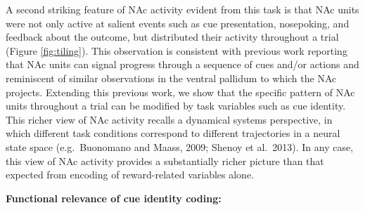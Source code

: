 \documentclass[11pt]{article}
\let\cite=\citep
\providecommand{\DIFadd}[1]{{\protect\color{red} \sf #1}} %
\providecommand{\DIFdel}[1]{} %
\providecommand{\DIFaddbegin}{} %
\providecommand{\DIFaddend}{} %
\providecommand{\DIFdelbegin}{} %
\providecommand{\DIFdelend}{} %
\newcommand{\DIFscaledelfig}{0.5}
\newlength{\DIFdelgraphicswidth} %
\newlength{\DIFdelgraphicsheight} %
\newcommand{\DIFaddincludegraphics}[2][]{{\color{red}\fbox{\DIFOincludegraphics[#1]{#2}}}} %
\newcommand{\DIFdelincludegraphics}[2][]{%
\sbox{\DIFdelgraphicsbox}{\DIFOincludegraphics[#1]{#2}}%
\settoboxwidth{\DIFdelgraphicswidth}{\DIFdelgraphicsbox} %
\settoboxtotalheight{\DIFdelgraphicsheight}{\DIFdelgraphicsbox} %
\scalebox{\DIFscaledelfig}{%
\parbox[b]{\DIFdelgraphicswidth}{\usebox{\DIFdelgraphicsbox}\\[-\baselineskip] \rule{\DIFdelgraphicswidth}{0em}}\llap{\resizebox{\DIFdelgraphicswidth}{\DIFdelgraphicsheight}{%
\setlength{\unitlength}{\DIFdelgraphicswidth}%
\begin{picture}(1,1)%
\thicklines\linethickness{2pt} %
{\color[rgb]{1,0,0}\put(0,0){\framebox(1,1){}}}%
{\color[rgb]{1,0,0}\put(0,0){\line( 1,1){1}}}%
{\color[rgb]{1,0,0}\put(0,1){\line(1,-1){1}}}%
\end{picture}%
}\hspace*{3pt}}} %
} %
\DeclareRobustCommand{\DIFaddbegin}{\DIFOaddbegin \let\includegraphics\DIFaddincludegraphics} %
\DeclareRobustCommand{\DIFaddend}{\DIFOaddend \let\includegraphics\DIFOincludegraphics} %
\DeclareRobustCommand{\DIFdelbegin}{\DIFOdelbegin \let\includegraphics\DIFdelincludegraphics} %
\DeclareRobustCommand{\DIFdelend}{\DIFOaddend \let\includegraphics\DIFOincludegraphics} %
\begin{document}
\DIFadd{A second striking feature of NAc activity evident from this task is
that }\DIFaddend NAc \DIFaddbegin \DIFadd{units were not only active at salient events such as cue
presentation, nosepoking, and feedback about the outcome, but
distributed their activity throughout a trial (Figure
\ref{fig:tiling}). This observation is consistent with previous work
reporting that NAc }\DIFaddend units can \DIFdelbegin \DIFdel{also }\DIFdelend signal progress through a sequence of
cues and/or actions
\cite{Shidara1998,Mulder2004,Khamassi2008,Berke2009,Lansink2012,Atallah2014}
\DIFdelbegin \DIFdel{. Given
that the current task was pseudo-random, it is possible that the rats
learned the structure of sequential cue presentation,
and the neural activity could reflect this.However, this is unlikely as including a ‘previous trial’ variable in the analysis did not explain a
significant amount of firing rate variance in response to the cue for
the vast majority of units. In any case, NAc units on the present
task continued to distinguish between different locations, even though
location, and
progress through a sequence, were explicitly irrelevant
in predicting reward. We speculate that this persistent coding of
location in NAc may represent a bias in credit assignment, and
associated tendency for rodents to associate motivationally relevant events with the locations where they occur.
}\DIFdelend \DIFaddbegin \DIFadd{and reminiscent of similar observations in the ventral pallidum
\cite{Tingley2018} to which the NAc projects. Extending this previous
work, we show that the specific pattern of NAc units throughout a
trial can be modified by task variables such as cue identity. This
richer view of NAc activity recalls a dynamical systems perspective,
in which different task conditions correspond to different
trajectories in a neural state space (e.g.\ Buonomano and Maass, 2009;
Shenoy et al.\ 2013). In any case, this view of NAc activity provides
a substantially richer picture than that expected from encoding of
reward-related variables alone.
}\DIFaddend 

{\bf \DIFdelbegin \DIFdel{Implications:}\DIFdelend \DIFaddbegin \DIFadd{Functional relevance of cue identity coding:}\DIFaddend }
\end{document}
